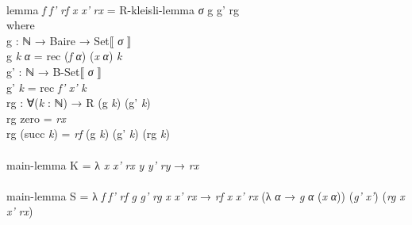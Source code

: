 \documentclass{entcs} \usepackage{prentcsmacro}
\newcommand{\AgdaFontStyle}[1]{\textsf{#1}}
\newcommand{\AgdaBoundFontStyle}[1]{\textit{#1}}
\newcommand{\AgdaKeyword}     [1]
    {\AgdaFontStyle{\textcolor{AgdaKeyword}{#1}}}
\newcommand{\AgdaSymbol}      [1]{\textcolor{AgdaSymbol}{#1}}
\newcommand{\AgdaBound}    [1]{\AgdaBoundFontStyle{\textcolor{AgdaBound}{#1}}}
\newcommand{\AgdaInductiveConstructor}[1]
    {\AgdaFontStyle{\textcolor{AgdaInductiveConstructor}{#1}}}
\newcommand{\AgdaDatatype} [1]{\AgdaFontStyle{\textcolor{AgdaDatatype}{#1}}}
\newcommand{\AgdaFunction} [1]{\AgdaFontStyle{\textcolor{AgdaFunction}{#1}}}
\newcommand{\AgdaIndent}[1]{\quad}
\newcommand{\AgdaCodeStyle}{\small}
\newenvironment{code}%
{\noindent\AgdaCodeStyle\pboxed}%
{\endpboxed\par\noindent%
\ignorespacesafterend}
\begin{document}
\begin{code}
\\
\>[0]\AgdaIndent{4}{}\<[4]%
\>[4]\AgdaFunction{lemma} \AgdaBound{f} \AgdaBound{f'} \AgdaBound{rf} \AgdaBound{x} \AgdaBound{x'} \AgdaBound{rx} \AgdaSymbol{=} \AgdaFunction{R-kleisli-lemma} \AgdaBound{σ} \AgdaFunction{g} \AgdaFunction{g'} \AgdaFunction{rg}\<%
\\
\>[0]\AgdaIndent{6}{}\<[6]%
\>[6]\AgdaKeyword{where}\<%
\\
\>[6]\AgdaIndent{8}{}\<[8]%
\>[8]\AgdaFunction{g} \AgdaSymbol{:} \AgdaDatatype{ℕ} \AgdaSymbol{→} \AgdaFunction{Baire} \AgdaSymbol{→} \AgdaFunction{Set⟦} \AgdaBound{σ} \AgdaFunction{⟧}\<%
\\
\>[6]\AgdaIndent{8}{}\<[8]%
\>[8]\AgdaFunction{g} \AgdaBound{k} \AgdaBound{α} \AgdaSymbol{=} \AgdaFunction{rec} \AgdaSymbol{(}\AgdaBound{f} \AgdaBound{α}\AgdaSymbol{)} \AgdaSymbol{(}\AgdaBound{x} \AgdaBound{α}\AgdaSymbol{)} \AgdaBound{k}\<%
\\
\>[6]\AgdaIndent{8}{}\<[8]%
\>[8]\AgdaFunction{g'} \AgdaSymbol{:} \AgdaDatatype{ℕ} \AgdaSymbol{→} \AgdaFunction{B-Set⟦} \AgdaBound{σ} \AgdaFunction{⟧}\<%
\\
\>[6]\AgdaIndent{8}{}\<[8]%
\>[8]\AgdaFunction{g'} \AgdaBound{k} \AgdaSymbol{=} \AgdaFunction{rec} \AgdaBound{f'} \AgdaBound{x'} \AgdaBound{k}\<%
\\
\>[6]\AgdaIndent{8}{}\<[8]%
\>[8]\AgdaFunction{rg} \AgdaSymbol{:} \AgdaSymbol{∀(}\AgdaBound{k} \AgdaSymbol{:} \AgdaDatatype{ℕ}\AgdaSymbol{)} \AgdaSymbol{→} \AgdaFunction{R} \AgdaSymbol{(}\AgdaFunction{g} \AgdaBound{k}\AgdaSymbol{)} \AgdaSymbol{(}\AgdaFunction{g'} \AgdaBound{k}\AgdaSymbol{)}\<%
\\
\>[6]\AgdaIndent{8}{}\<[8]%
\>[8]\AgdaFunction{rg} \AgdaInductiveConstructor{zero} \AgdaSymbol{=} \AgdaBound{rx} \<[22]%
\>[22]\<%
\\
\>[6]\AgdaIndent{8}{}\<[8]%
\>[8]\AgdaFunction{rg} \AgdaSymbol{(}\AgdaInductiveConstructor{succ} \AgdaBound{k}\AgdaSymbol{)} \AgdaSymbol{=} \AgdaBound{rf} \AgdaSymbol{(}\AgdaFunction{g} \AgdaBound{k}\AgdaSymbol{)} \AgdaSymbol{(}\AgdaFunction{g'} \AgdaBound{k}\AgdaSymbol{)} \AgdaSymbol{(}\AgdaFunction{rg} \AgdaBound{k}\AgdaSymbol{)}\<%
\\
%
\\
\>\AgdaFunction{main-lemma} \AgdaInductiveConstructor{K} \AgdaSymbol{=} \AgdaSymbol{λ} \AgdaBound{x} \AgdaBound{x'} \AgdaBound{rx} \AgdaBound{y} \AgdaBound{y'} \AgdaBound{ry} \AgdaSymbol{→} \AgdaBound{rx} \<[38]%
\>[38]\<%
\\
%
\\
\>\AgdaFunction{main-lemma} \AgdaInductiveConstructor{S} \AgdaSymbol{=} \AgdaSymbol{λ} \AgdaBound{f} \AgdaBound{f'} \AgdaBound{rf} \AgdaBound{g} \AgdaBound{g'} \AgdaBound{rg} \AgdaBound{x} \AgdaBound{x'} \AgdaBound{rx} \AgdaSymbol{→} \AgdaBound{rf} \AgdaBound{x} \AgdaBound{x'} \AgdaBound{rx} \AgdaSymbol{(λ} \AgdaBound{α} \AgdaSymbol{→} \AgdaBound{g} \AgdaBound{α} \AgdaSymbol{(}\AgdaBound{x} \AgdaBound{α}\AgdaSymbol{))} \AgdaSymbol{(}\AgdaBound{g'} \AgdaBound{x'}\AgdaSymbol{)} \AgdaSymbol{(}\AgdaBound{rg} \AgdaBound{x} \AgdaBound{x'} \AgdaBound{rx}\AgdaSymbol{)} \<[93]%

\end{code}
\end{document}

